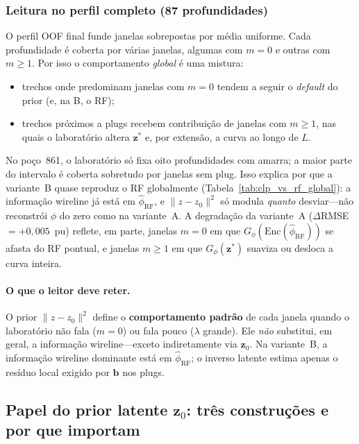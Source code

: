 \documentclass[11pt,a4paper]{article}
\newcommand{\zvec}{\ensuremath{\mathbf{z}}}
\newcommand{\zzero}{\ensuremath{\mathbf{z}_0}}
\begin{document}
\subsubsection{Leitura no perfil completo (87 profundidades)}

O perfil OOF final funde janelas sobrepostas por média uniforme.
Cada profundidade é coberta por várias janelas, algumas com $m=0$ e
outras com $m\ge 1$.
Por isso o comportamento \emph{global} é uma mistura:
\begin{itemize}
  \item trechos onde predominam janelas com $m=0$ tendem a seguir o
        \emph{default} do prior (e, na B, o RF);
  \item trechos próximos a plugs recebem contribuição de janelas com
        $m\ge 1$, nas quais o laboratório altera $\zvec^{\ast}$ e, por
        extensão, a curva ao longo de $L$.
\end{itemize}

No poço~861, o laboratório só fixa oito profundidades com amarra; a
maior parte do intervalo é coberta sobretudo por janelas sem plug.
Isso explica por que a variante~B quase reproduz o RF globalmente
(Tabela~\ref{tab:clp_vs_rf_global}): a informação wireline já está em
$\widehat{\phi}_{\mathrm{RF}}$, e $\|z-z_0\|^2$ só modula \emph{quanto}
desviar---não reconstrói $\phi$ do zero como na variante~A.
A degradação da variante~A ($\Delta$RMSE $=+0{,}005$~pu) reflete,
em parte, janelas $m=0$ em que $G_{\phi}(\mathrm{Enc}(\widehat{\phi}_{\mathrm{RF}}))$
se afasta do RF pontual, e janelas $m\ge 1$ em que $G_{\phi}(\zvec^{\ast})$
suaviza ou desloca a curva inteira.

\paragraph{O que o leitor deve reter.}
O prior $\|z-z_0\|^2$ define o \textbf{comportamento padrão} de cada
janela quando o laboratório não fala ($m=0$) ou fala pouco ($\lambda$
grande).
Ele \emph{não} substitui, em geral, a informação wireline---exceto
indiretamente via $\zzero$.
Na variante~B, a informação wireline dominante está em
$\widehat{\phi}_{\mathrm{RF}}$; o inverso latente estima apenas o
resíduo local exigido por $\mathbf{b}$ nos plugs.

\subsection{Papel do prior latente \texorpdfstring{$\zzero$}{z0}:
três construções e por que importam}
\label{sec:clp_z0}
\end{document}

